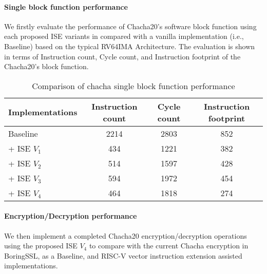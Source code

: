 
\paragraph{Single block function performance}
We firstly evaluate the performance of Chacha20's software block function using each proposed ISE variants in compared with a vanilla implementation (i.e., Baseline) based on the typical RV64IMA Architecture. The evaluation is shown in terms of Instruction count, Cycle count, and Instruction footprint of the Chacha20's block function.

\begin{table}
\caption{Comparison of chacha single block function performance}
\label{tab:res:sw:perf}
\begin{tabular}{lccc}
\toprule            
Implementations        & Instruction count   & Cycle count & Instruction footprint\\

\midrule
Baseline     & 2214     & 2803  &  852 \\
 + ISE $V_1$ &  434     & 1221  &  382 \\
 + ISE $V_2$ &  514     & 1597  &  428 \\
 + ISE $V_3$ &  594     & 1972  &  454 \\
 + ISE $V_4$ &  464     & 1818  &  274 \\

\bottomrule
\end{tabular}
\end{table}

\paragraph{Encryption/Decryption performance}
We then implement a completed Chacha20 encryption/decryption operations using the proposed ISE $V_4$ to compare with the current Chacha encryption in BoringSSL, as a Baseline, and RISC-V vector instruction extension assisted implementations.

